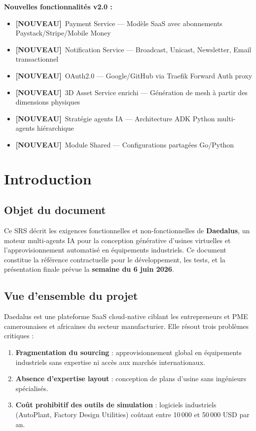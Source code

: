 \documentclass[12pt,a4paper]{article}
\newcommand{\NEW}{\textcolor{daedalusgold}{\textbf{[NOUVEAU]}}}
\begin{document}
\vspace{1em}
\noindent\textbf{Nouvelles fonctionnalités v2.0 :}
\begin{itemize}[noitemsep]
  \item \NEW\ Payment Service — Modèle SaaS avec abonnements Paystack/Stripe/Mobile Money
  \item \NEW\ Notification Service — Broadcast, Unicast, Newsletter, Email transactionnel
  \item \NEW\ OAuth2.0 — Google/GitHub via Traefik Forward Auth proxy
  \item \NEW\ 3D Asset Service enrichi — Génération de mesh à partir des dimensions physiques
  \item \NEW\ Stratégie agents IA — Architecture ADK Python multi-agents hiérarchique
  \item \NEW\ Module Shared — Configurations partagées Go/Python
\end{itemize}

\newpage
\tableofcontents
\newpage

\section{Introduction}

\subsection{Objet du document}
Ce SRS décrit les exigences fonctionnelles et non-fonctionnelles de \textbf{Daedalus}, un moteur multi-agents IA pour la conception générative d'usines virtuelles et l'approvisionnement automatisé en équipements industriels. Ce document constitue la référence contractuelle pour le développement, les tests, et la présentation finale prévue la \textbf{semaine du 6 juin 2026}.

\subsection{Vue d'ensemble du projet}
Daedalus est une plateforme SaaS cloud-native ciblant les entrepreneurs et PME camerounaises et africaines du secteur manufacturier. Elle résout trois problèmes critiques :

\begin{enumerate}
  \item \textbf{Fragmentation du sourcing} : approvisionnement global en équipements industriels sans expertise ni accès aux marchés internationaux.
  \item \textbf{Absence d'expertise layout} : conception de plans d'usine sans ingénieurs spécialisés.
  \item \textbf{Coût prohibitif des outils de simulation} : logiciels industriels (AutoPlant, Factory Design Utilities) coûtant entre 10\,000 et 50\,000 USD par an.
\end{enumerate}
\end{document}
